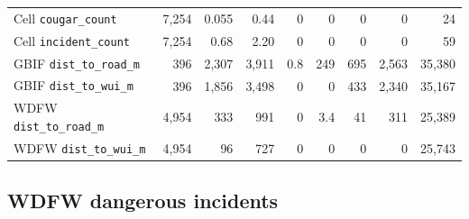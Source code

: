 \documentclass[11pt, a4paper]{article}
\begin{document}
\begin{table}[!htb]
\begin{tabular}{lrrrrrrrr}
    Cell \texttt{cougar\_count}      & 7,254  & 0.055  & 0.44   & 0      & 0      & 0      & 0      & 24      \\
    Cell \texttt{incident\_count}    & 7,254  & 0.68   & 2.20   & 0      & 0      & 0      & 0      & 59      \\
    GBIF \texttt{dist\_to\_road\_m}  & 396    & 2,307  & 3,911  & 0.8    & 249    & 695    & 2,563  & 35,380  \\
    GBIF \texttt{dist\_to\_wui\_m}   & 396    & 1,856  & 3,498  & 0      & 0      & 433    & 2,340  & 35,167  \\
    WDFW \texttt{dist\_to\_road\_m}  & 4,954  & 333    & 991    & 0      & 3.4    & 41     & 311    & 25,389  \\
    WDFW \texttt{dist\_to\_wui\_m}   & 4,954  & 96     & 727    & 0      & 0      & 0      & 0      & 25,743  \\
    \bottomrule
  \end{tabular}
\end{table}

\subsection{WDFW dangerous incidents}
\end{document}
